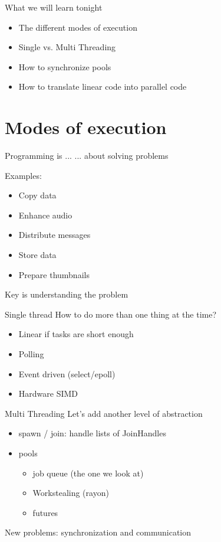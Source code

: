 \documentclass[aspectratio=1610,t]{beamer}
\begin{document}
\begin{frame}[fragile]{What we will learn tonight}

\begin{itemize}
 \item The different modes of execution
 \item Single vs. Multi Threading
 \item How to synchronize pools
 \item How to translate linear code into parallel code
\end{itemize}

\end{frame}

{
\section{Modes of execution}
}

\begin{frame}[fragile]{Programming is ...}
... about solving problems

Examples:
\begin{itemize}
  \item Copy data
  \item Enhance audio
  \item Distribute messages
  \item Store data
  \item Prepare thumbnails
\end{itemize}

Key is understanding the problem
\end{frame}

\begin{frame}[fragile]{Single thread}
How to do more than one thing at the time?

\begin{itemize}
  \item Linear if tasks are short enough
  \item Polling
  \item Event driven (select/epoll)
  \item Hardware SIMD
\end{itemize}
\end{frame}

\begin{frame}[fragile]{Multi Threading}
Let's add another level of abstraction
\begin{itemize}
  \item spawn / join: handle lists of JoinHandles
  \item pools \begin{itemize}
      \item job queue (the one we look at)
      \item Workstealing (rayon)
      \item futures
    \end{itemize}
\end{itemize}

New problems: synchronization and communication

\end{frame}
\end{document}
